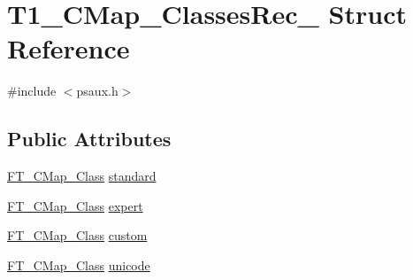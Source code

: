 \hypertarget{struct_t1___c_map___classes_rec__}{\section{T1\-\_\-\-C\-Map\-\_\-\-Classes\-Rec\-\_\- Struct Reference}
\label{struct_t1___c_map___classes_rec__}
}


{\ttfamily \#include $<$psaux.\-h$>$}

\subsection*{Public Attributes}
\begin{DoxyCompactItemize}
\item 
\hyperlink{ftobjs_8h_af6ac93d072307dd61214e0d2b7c0e924}{F\-T\-\_\-\-C\-Map\-\_\-\-Class} \hyperlink{struct_t1___c_map___classes_rec___a11bc9e986af1c0cf91bd67e2e30028ca}{standard}
\item 
\hyperlink{ftobjs_8h_af6ac93d072307dd61214e0d2b7c0e924}{F\-T\-\_\-\-C\-Map\-\_\-\-Class} \hyperlink{struct_t1___c_map___classes_rec___a9576c404d5197dd66498725eacde1302}{expert}
\item 
\hyperlink{ftobjs_8h_af6ac93d072307dd61214e0d2b7c0e924}{F\-T\-\_\-\-C\-Map\-\_\-\-Class} \hyperlink{struct_t1___c_map___classes_rec___a21378ef457d58cc00f357011f45fba5e}{custom}
\item 
\hyperlink{ftobjs_8h_af6ac93d072307dd61214e0d2b7c0e924}{F\-T\-\_\-\-C\-Map\-\_\-\-Class} \hyperlink{struct_t1___c_map___classes_rec___aab1eef66893dd7b0d25897612d056d4a}{unicode}
\end{DoxyCompactItemize}


